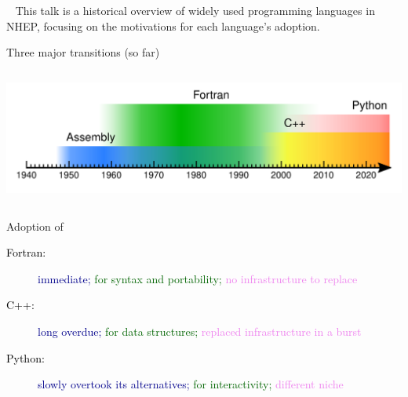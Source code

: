 \documentclass[aspectratio=169]{beamer}
\begin{document}
\begin{frame}{\mbox{ }}
\large
\vspace{0.5 cm}
This talk is a historical overview of widely used programming languages in NHEP, focusing on the motivations for each language's adoption.

\vspace{1 cm}

\vspace{1 cm}

\vspace{0.2 cm}
\end{frame}

\begin{frame}{Three major transitions (so far)}
\begin{columns}
\includegraphics[width=\linewidth]{PLOTS/programming-languages.pdf}
\end{columns}

\large
\vspace{0.5 cm}
Adoption of

\begin{description}
\item[\textcolor{black}{Fortran:}] \textcolor{darkblue}{immediate;} \textcolor{darkgreen}{for syntax and portability;} \textcolor{violet}{no infrastructure to replace}
\item[\textcolor{black}{C++:}] \textcolor{darkblue}{long overdue;} \textcolor{darkgreen}{for data structures;} \textcolor{violet}{replaced infrastructure in a burst}
\item[\textcolor{black}{Python:}] \textcolor{darkblue}{slowly overtook its alternatives;} \textcolor{darkgreen}{for interactivity;} \textcolor{violet}{different niche}
\end{description}
\end{frame}
\end{document}
